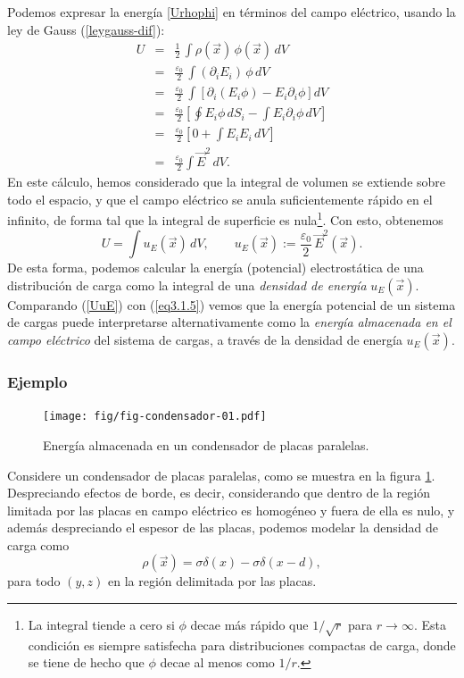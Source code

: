 Podemos expresar la energía \eqref{Urhophi} en términos del campo eléctrico,
usando la ley de Gauss (\ref{leygauss-dif}):
\begin{eqnarray}
U&=&\frac{1}{2}\,\int\rho(\vec{x})\,\phi(\vec{x})\,dV \\
&=&\frac{\varepsilon_0}{2}\,\int(\partial_i E_i)\,\phi\,dV\\
&=&\frac{\varepsilon_0}{2}\,\int\left[
\partial_i(E_i\phi)-E_i\partial_i\phi\right] dV\\
&=&\frac{\varepsilon_0}{2}\left[\oint
E_i\phi\,dS_i-\int E_i\partial_i\phi\, dV\right]\\
&=&\frac{\varepsilon_0}{2}\left[0+\int E_iE_i\, dV\right]\\
&=&\frac{\varepsilon_0}{2}\int \vec{E}^2\, dV.
\end{eqnarray}
En este cálculo, hemos considerado que la integral de volumen se extiende sobre
todo el espacio, y que el campo eléctrico se anula suficientemente rápido en
el infinito, de forma tal que la integral de superficie es nula\footnote{La integral tiende a cero si $\phi$ decae más rápido que $1/\sqrt{r}$ para $r\to\infty$. Esta condición es siempre satisfecha para distribuciones compactas de carga, donde se tiene de hecho que $\phi$ decae al menos como $1/r$.}. Con esto,
obtenemos
\begin{equation} \label{UuE}
\boxed{U=\int u_E(\vec{x})\,dV, \qquad u_E(\vec{x}):=\frac{\varepsilon_0}{2}\,
\vec{E}^2(\vec{x}) .}
\end{equation}
De esta forma, podemos calcular la energía (potencial) electrostática de una
distribución de carga como la integral de una \textit{densidad de energía}
$u_E(\vec{x})$. Comparando (\ref{UuE}) con (\ref{eq3.1.5}) vemos que la
energía potencial de un sistema de cargas puede interpretarse alternativamente
como la \textit{energía almacenada en el campo eléctrico} del sistema de
cargas, a través de la densidad de energía $u_E(\vec{x})$.

\subsubsection{Ejemplo}
\begin{figure}[!h]
\centerline{\texttt{[image: fig/fig-condensador-01.pdf]}}
\caption{Energía almacenada en un condensador de placas paralelas.}
\label{fig:cpp}
\end{figure}
Considere un condensador de placas paralelas, como se muestra en la figura \ref{fig:cpp}. Despreciando efectos de borde, es decir, considerando que dentro de la región limitada por las placas en campo eléctrico es homogéneo y fuera de ella es nulo, y además despreciando el espesor de las placas, podemos modelar la densidad de carga como
\begin{equation}
\rho(\vec{x})=\sigma\delta(x)-\sigma\delta(x-d), 
\end{equation}
para todo $(y,z)$ en la región delimitada por las placas. 

